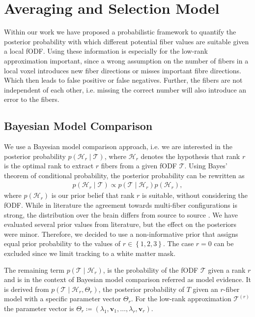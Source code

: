 \section{Averaging and Selection Model}

Within our work we have proposed a probabilistic framework
to quantify the posterior probability with which different potential fiber values
are suitable given a local fODF.
Using these information is especially for the low-rank approximation important,
since a wrong assumption on the number of fibers in a local voxel introduces new
fiber directions or misses important fibre directions. Which then leads to false
positive or false negatives. Further, the fibers are not independent of each
other, i.e. missing the correct number will also introduce an error to the
fibers.

\subsection{Bayesian Model Comparison}
We use a Bayesian model comparison approach, i.e. we are interested in the
posterior probability $p \left( \mathcal{H}_r \mid \mathcal{T} \right)$, where
$\mathcal{H}_r$ denotes the hypothesis that rank $r$ is the optimal rank to
extract $r$ fibers from a given fODF $\mathcal{T}$. Using Bayes' theorem of
conditional probability, the posterior probability can be rewritten as
\begin{align}
	p \left( \mathcal{H}_r \mid \mathcal{T} \right) \propto p \left(
		\mathcal{T} \mid \mathcal{H}_r 
	\right) p \left(  \mathcal{H}_r \right), 
	\label{eq:Bayes}
\end{align}
where $p \left(  \mathcal{H}_r \right)$ is our prior belief that rank $r$ is
suitable, without considering the fODF. While in literature the agreement
towards multi-fiber configurations is strong, the distribution over the brain
differs from source to source  \cite{BEHRENS2007144,Jeurissen:2012, Schultz:MICCAI12}. We have evaluated several  prior values from literature,
but the effect on the posteriors were minor. Therefore, we decided to use a
non-informative prior that assigns equal prior probability to the values of $r
\in \left\{ 1,2,3 \right\}$. The case $r=0$ can be excluded since we limit
tracking to a white matter mask. 

The remaining term $p \left( \mathcal{T} \mid \mathcal{H}_r \right)$, is the
probability of the fODF $\mathcal{T}$ given a rank $r$ and is in the context of
Bayesian model comparison referred as model evidence. It is derived from $p
\left( \mathcal{T} \mid \mathcal{H}_r , \Theta_r \right)$, the posterior
probability of $T$ given an $r$-fiber model with a specific parameter vector
$\Theta_r$. For the low-rank approximation $\mathcal{T}^{\left( r \right)}$ the
parameter vector is $\Theta_r \coloneqq \left( \lambda_1 , \mathbf{v}_1 , \dots
, \lambda_r , \mathbf{v}_r \right)$. 


